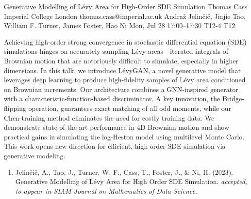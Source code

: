 \documentclass[12pt,lettersize,oneside]{book} %
\begin{document}
\begin{talk}
  {Generative Modelling of L\'evy Area for High-Order SDE Simulation}%
  {Thomas Cass}%
  {Imperial College London}%
  {thomas.cass@imperial.ac.uk}%
  {Andra\v{z} Jelin\v{c}i\v{c},  Jiajie Tao, William F. Turner, James Foster, Hao Ni}%
  {}%
  {Mon, Jul 28 17:00--17:30}%
  {T12-4}%
  {T12}%
  
    
Achieving high-order strong convergence in stochastic differential equation (SDE) simulations hinges on accurately sampling L\'evy areas—iterated integrals of Brownian motion that are notoriously difficult to simulate, especially in higher dimensions. In this talk, we introduce L\'evyGAN, a novel generative model that leverages deep learning to produce high-fidelity samples of L\'evy area conditioned on Brownian increments. Our architecture combines a GNN-inspired generator with a characteristic-function-based discriminator. A key innovation, the Bridge-flipping operation, guarantees exact matching of all odd moments, while our Chen-training method eliminates the need for costly training data. We demonstrate state-of-the-art performance in 4D Brownian motion and show practical gains in simulating the log-Heston model using multilevel Monte Carlo. This work opens new direction for efficient, high-order SDE simulation via generative modeling.


\medskip

\begin{enumerate}
 \item[{[1]}] Jelin\v{c}i\v{c}, A., Tao, J., Turner, W. F., Cass, T., Foster, J., \& Ni, H. (2023). Generative Modelling of L\'evy Area for High Order SDE Simulation. \textit{accepted, to appear in SIAM Journal on Mathematics of Data Science}.
\end{enumerate}
\end{talk}
\end{document}
